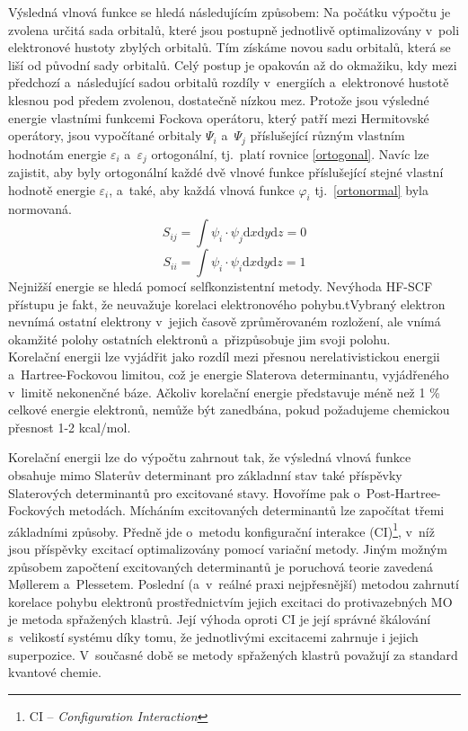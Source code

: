 \documentclass[
digital, %
table,   %
nolof,     %
nolot,     %
oneside,
]{fithesis3}
\begin{document}
Výsledná vlnová funkce se hledá následujícím způsobem: Na počátku výpočtu je zvolena určitá sada orbitalů, které jsou postupně jednotlivě optimalizovány v~poli elektronové hustoty zbylých orbitalů. Tím získáme novou sadu orbitalů, která se liší od původní sady orbitalů. Celý postup je opakován až do okmažiku, kdy mezi předchozí a~následující sadou orbitalů rozdíly v~energiích a~elektronové hustotě klesnou pod předem zvolenou, dostatečně nízkou mez. Protože jsou výsledné energie vlastními funkcemi Fockova operátoru, který patří mezi Hermitovské operátory, jsou vypočítané orbitaly $\Psi_i$ a~$\Psi_j$ příslušející různým vlastním hodnotám energie $\varepsilon_i $ a~$\varepsilon_j$ ortogonální, tj.~platí rovnice \ref{ortogonal}. Navíc lze zajistit, aby byly ortogonální každé dvě vlnové funkce příslušející stejné vlastní hodnotě energie $\varepsilon_i$, a~také, aby každá vlnová funkce $\varphi_i$ tj.~\ref{ortonormal} byla normovaná.
\begin{equation}
S_{ij} = \int \psi_i \cdot \psi_j \mathrm{d}x\mathrm{d}y\mathrm{d}z = 0
\label{ortogonal}
\end{equation}
\begin{equation}
S_{ii} = \int \psi_i \cdot \psi_i \mathrm{d}x\mathrm{d}y\mathrm{d}z = 1
\label{ortonormal}
\end{equation}
Nejnižší energie se hledá pomocí selfkonzistentní metody. Nevýhoda HF-SCF přístupu je fakt, že neuvažuje korelaci elektronového pohybu.tVybraný elektron nevnímá ostatní elektrony v~jejich časově zprůměrovaném rozložení, ale vnímá okamžité polohy ostatních elektronů a~přizpůsobuje jim svoji polohu.\\

Korelační energii lze vyjádřit jako rozdíl mezi přesnou nerelativistickou energii a~Hartree-Fockovou limitou, což je energie Slaterova determinantu, vyjádřeného v~limitě nekonenčné báze. Ačkoliv korelační energie představuje méně než 1 \% celkové energie elektronů, nemůže být zanedbána, pokud požadujeme chemickou přesnost 1-2 kcal/mol.

Korelační energii lze do výpočtu zahrnout tak, že výsledná vlnová funkce obsahuje mimo Slaterův determinant pro základnní stav také příspěvky Slaterových determinantů pro excitované stavy. Hovoříme pak o~Post-Hartree-Fockových metodách. Mícháním excitovaných determinantů lze započítat třemi základními způsoby. Předně jde o~metodu konfigurační interakce (CI)\footnote{CI -- \textit{Configuration Interaction}}, v~níž jsou příspěvky excitací optimalizovány pomocí variační metody. Jiným možným způsobem započtení excitovaných determinantů je poruchová teorie zavedená M{\o}llerem a~Plessetem. Poslední (a~v~reálné praxi nejpřesnější) metodou zahrnutí korelace pohybu elektronů prostřednictvím jejich excitaci do protivazebných MO je metoda spřažených klastrů. Její výhoda oproti CI je její správné škálování s~velikostí systému díky tomu, že jednotlivými excitacemi zahrnuje i jejich superpozice. V~současné době se metody spřažených klastrů považují za standard kvantové chemie.
\end{document}
